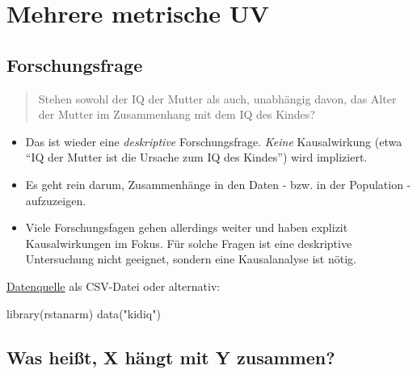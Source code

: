 \documentclass[
  a4paper,
  DIV=11]{scrreprt}
\newenvironment{Shaded}{\begin{snugshade}}{\end{snugshade}}
\newcommand{\FunctionTok}[1]{\textcolor[rgb]{0.28,0.35,0.67}{#1}}
\newcommand{\NormalTok}[1]{\textcolor[rgb]{0.00,0.23,0.31}{#1}}
\newcommand{\StringTok}[1]{\textcolor[rgb]{0.13,0.47,0.30}{#1}}
\providecommand{\tightlist}{%
  \setlength{\itemsep}{0pt}\setlength{\parskip}{0pt}}\usepackage{longtable,booktabs,array}
\theoremstyle{definition}
\theoremstyle{remark}
\begin{document}
\hypertarget{mehrere-metrische-uv}{%
\section{Mehrere metrische UV}\label{mehrere-metrische-uv}}

\hypertarget{forschungsfrage-3}{%
\subsection{Forschungsfrage}\label{forschungsfrage-3}}

\begin{quote}
Stehen sowohl der IQ der Mutter als auch, unabhängig davon, das Alter
der Mutter im Zusammenhang mit dem IQ des Kindes?
\end{quote}

\begin{itemize}
\tightlist
\item
  Das ist wieder eine \emph{deskriptive} Forschungsfrage. \emph{Keine}
  Kausalwirkung (etwa ``IQ der Mutter ist die Ursache zum IQ des
  Kindes'') wird impliziert.
\item
  Es geht rein darum, Zusammenhänge in den Daten - bzw. in der
  Population - aufzuzeigen.
\item
  Viele Forschungsfagen gehen allerdings weiter und haben explizit
  Kausalwirkungen im Fokus. Für solche Fragen ist eine deskriptive
  Untersuchung nicht geeignet, sondern eine Kausalanalyse ist nötig.
\end{itemize}

\href{https://raw.githubusercontent.com/sebastiansauer/Lehre/data/main/Data/kidiq.csv}{Datenquelle}
als CSV-Datei oder alternativ:

\begin{Shaded}
\begin{Highlighting}[]
\FunctionTok{library}\NormalTok{(rstanarm)}
\FunctionTok{data}\NormalTok{(}\StringTok{"kidiq"}\NormalTok{)}
\end{Highlighting}
\end{Shaded}

\hypertarget{was-heiuxdft-x-huxe4ngt-mit-y-zusammen}{%
\subsection{Was heißt, X hängt mit Y
zusammen?}\label{was-heiuxdft-x-huxe4ngt-mit-y-zusammen}}
\end{document}

